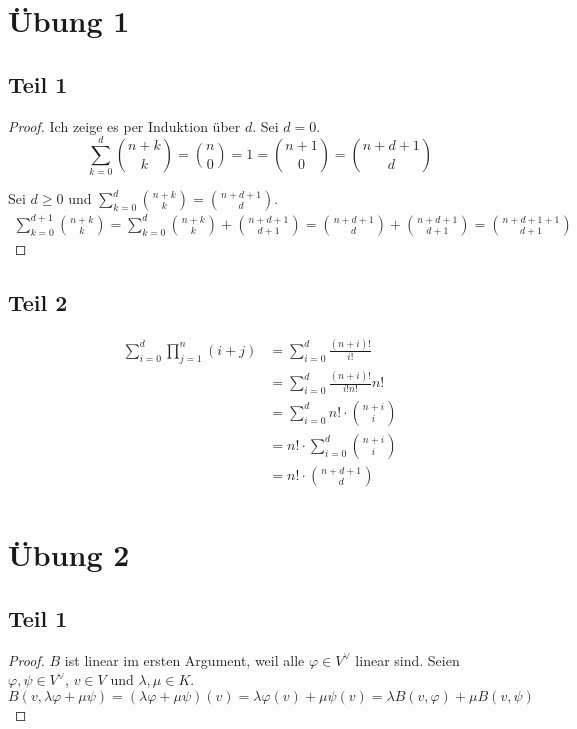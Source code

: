 \documentclass[10pt,a4paper]{article}
\begin{document}
\section*{Übung 1}

\subsection*{Teil 1}

\begin{proof}
Ich zeige es per Induktion über $d$.
Sei $d = 0$.
\begin{equation}
\sum_{k = 0}^{d} \binom{n + k}{k} = \binom{n}{0} = 1 = \binom{n + 1}{0} = \binom{n + d + 1}{d}
\end{equation}

Sei $d \ge 0$ und $\sum_{k = 0}^{d} \binom{n + k}{k} = \binom{n + d + 1}{d}$.
\begin{align*}
\sum_{k = 0}^{d + 1} \binom{n + k}{k} = \sum_{k = 0}^{d} \binom{n + k}{k} + \binom{n + d + 1}{d + 1} = \binom{n + d + 1}{d} + \binom{n + d + 1}{d + 1} = \binom{n + d + 1 + 1}{d + 1}
\end{align*}
\end{proof}

\subsection*{Teil 2}

\begin{align*}
\sum_{i = 0}^{d} \prod_{j = 1}^{n} (i + j) & = \sum_{i = 0}^{d} \frac{(n + i)!}{i!}\\
& = \sum_{i = 0}^{d} \frac{(n + i)!}{i!n!}n!\\
& = \sum_{i = 0}^{d} n! \cdot \binom{n + i}{i}\\
& = n! \cdot \sum_{i = 0}^{d} \binom{n + i}{i}\\
& = n! \cdot \binom{n + d + 1}{d}\\
\end{align*}

\section*{Übung 2}

\subsection*{Teil 1}

\begin{proof}
$B$ ist linear im ersten Argument, weil alle $\varphi \in V^{\vee}$ linear sind.
Seien $\varphi, \psi \in V^{\vee}$, $v \in V$ und $\lambda, \mu \in K$.
\begin{equation}
B(v, \lambda \varphi + \mu \psi) = (\lambda \varphi + \mu \psi)(v) = \lambda \varphi(v) + \mu \psi(v) = \lambda B(v, \varphi) + \mu B(v, \psi)
\end{equation}
\end{proof}
\end{document}
